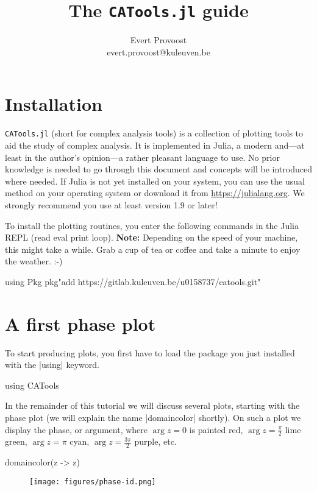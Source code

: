 \documentclass[a4paper]{article}
\title{\vspace*{-1em}The \texttt{CATools.jl} guide}
\author{Evert Provoost\\\normalsize evert.provoost@kuleuven.be}
\date{}
\begin{document}
\maketitle

\section{Installation}

\texttt{CATools.jl} (short for complex analysis tools) is a collection of
plotting tools to aid the study of complex analysis. It is implemented in Julia,
a modern and---at least in the author's opinion---a rather pleasant language to
use.  No prior knowledge is needed to go through this document and concepts will
be introduced where needed. If Julia is not yet installed on your system, you
can use the usual method on your operating system or download it from
\url{https://julialang.org}. We strongly recommend you use at least version 1.9
or later!

To install the plotting routines, you enter the following commands in the Julia
REPL (read eval print loop).  \textbf{Note:} Depending on the speed of your
machine, this might take a while. Grab a cup of tea or coffee and take a minute
to enjoy the weather. :-)

\begin{juliaverbatim}
	using Pkg
	pkg"add https://gitlab.kuleuven.be/u0158737/catools.git"
\end{juliaverbatim}

\section{A first phase plot}

To start producing plots, you first have to load the package you just installed
with the \jlv|using| keyword.

\begin{juliaverbatim}
	using CATools
\end{juliaverbatim}

In the remainder of this tutorial we will discuss several plots, starting with
the phase plot (we will explain the name \jlv|domaincolor| shortly). On such a
plot we display the phase, or argument, where $\arg z = 0$ is painted red,
$\arg z = \frac{\pi}{2}$ lime green, $\arg z = \pi$ cyan,
$\arg z = \frac{3\pi}{2}$ purple, etc.

\begin{juliaverbatim}
	domaincolor(z -> z)
\end{juliaverbatim}
\begin{figure}[H]
	\centering
	\texttt{[image: figures/phase-id.png]}
\end{figure}
\end{document}
